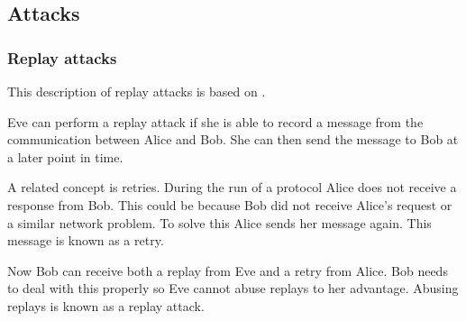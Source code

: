 \subsection{Attacks} 


\subsubsection{Replay attacks}
This description of replay attacks is based on \citet[p.~223]{cryptoenginering}.

Eve can perform a replay attack if she is able to record a message from the communication between Alice and Bob.
She can then send the message to Bob at a later point in time. 

A related concept is retries.
During the run of a protocol Alice does not receive a response from Bob.
This could be because Bob did not receive Alice's request or a similar network problem.
To solve this Alice sends her message again.
This message is known as a retry.

Now Bob can receive both a replay from Eve and a retry from Alice.
Bob needs to deal with this properly so Eve cannot abuse replays to her advantage.
Abusing replays is known as a replay attack.

